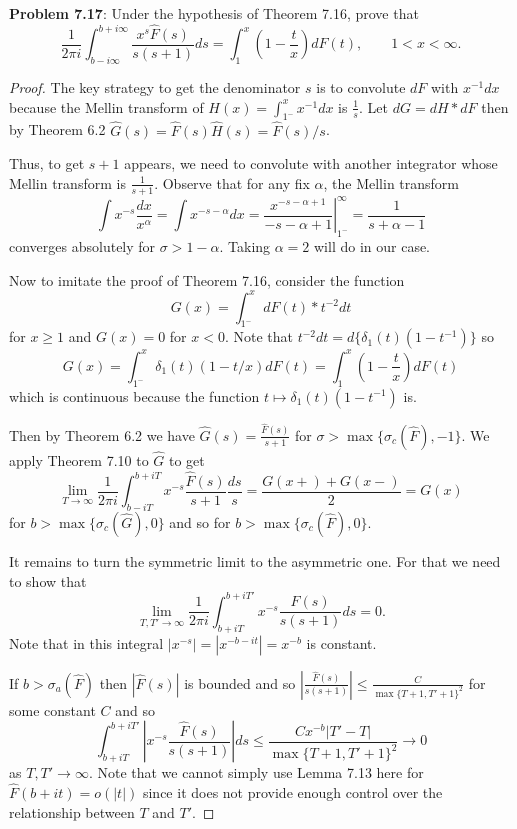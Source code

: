 \documentclass[12pt]{article}
\newcommand{\Fhat}{\widehat{F}}
\newcommand{\Ghat}{\widehat{G}}
\begin{document}
\fi

\textbf{Problem 7.17}: Under the hypothesis of Theorem 7.16, prove that
$$\frac{1}{2\pi i} \int_{b - i \infty}^{b + i\infty} \frac{x^s \Fhat(s)}{s(s+1)} ds = \int_1^x \left(1 - \frac{t}{x}\right) dF(t), \qquad 1 < x < \infty.$$

\begin{proof}
The key strategy to get the denominator $s$ is to convolute $dF$ with $x^{-1} dx$ because the Mellin transform of $H(x) = \int_{1^-}^x x^{-1} dx$ is $\frac{1}{s}$. Let $dG = dH * dF$ then by Theorem 6.2 $\Ghat(s) = \Fhat(s) \widehat{H}(s) = \Fhat(s)/s$.

Thus, to get $s+1$ appears, we need to convolute with another integrator whose Mellin transform is $\frac{1}{s + 1}$. Observe that for any fix $\alpha$, the Mellin transform
$$\int x^{-s} \frac{dx}{x^\alpha} = \int x^{-s-\alpha} dx = \left. \frac{x^{-s-\alpha+1}}{-s-\alpha+1} \right|_{1^-}^\infty = \frac{1}{s + \alpha - 1}$$
converges absolutely for $\sigma > 1 - \alpha$. Taking $\alpha = 2$ will do in our case.

Now to imitate the proof of Theorem 7.16, consider the function
$$G(x) = \int_{1^-}^{x} dF(t) * t^{-2} dt$$
for $x \geq 1$ and $G(x) = 0$ for $x < 0$. Note that $t^{-2} dt = d\{ \delta_1(t)(1 - t^{-1}) \}$ so
$$G(x) = \int_{1^-}^x \delta_1(t) \left(1 - t/x \right) dF(t) = \int_1^x \left(1 - \frac{t}{x}\right) dF(t)$$
which is continuous because the function $t \mapsto \delta_1(t)(1 - t^{-1})$ is.

Then by Theorem 6.2 we have $\Ghat(s) = \frac{\Fhat(s)}{s+1}$ for $\sigma > \max\{\sigma_c(\Fhat), -1\}$. We apply Theorem 7.10 to $\Ghat$ to get
$$\lim_{T \rightarrow \infty} \frac{1}{2 \pi i} \int_{b - iT}^{b + iT} x^{-s} \frac{\Fhat(s)}{s + 1} \frac{ds}{s} = \frac{G(x+) + G(x-)}{2} = G(x)$$
for $b > \max\{\sigma_c(\Ghat), 0\}$ and so for $b > \max\{\sigma_c(\Fhat), 0\}$.

It remains to turn the symmetric limit to the asymmetric one. For that we need to show that
\begin{equation}
\lim_{T, T' \rightarrow \infty} \frac{1}{2 \pi i} \int_{b + iT}^{b + iT'} x^{-s} \frac{\Fhat(s)}{s(s + 1)} ds = 0. \label{eq:limit_int_xsFhatssp1_equals_0}
\end{equation}
Note that in this integral $|x^{-s}| = |x^{-b-it}| = x^{-b}$ is constant.

If $b > \sigma_a(\Fhat)$ then $|\Fhat(s)|$ is bounded and so $|\frac{\Fhat(s)}{s(s + 1)}| \leq \frac{C}{\max\{T + 1, T' + 1\}^2}$ for some constant $C$ and so
$$\int_{b + iT}^{b + iT'} |x^{-s} \frac{\Fhat(s)}{s(s + 1)}| ds \leq \frac{C x^{-b} |T' - T|}{\max\{T + 1, T' + 1\}^2} \rightarrow 0$$
as $T, T' \rightarrow \infty$. Note that we cannot simply use Lemma 7.13 here for $\Fhat(b + it) = o(|t|)$ since it does not provide enough control over the relationship between $T$ and $T'$.


\end{proof}
\end{document}
